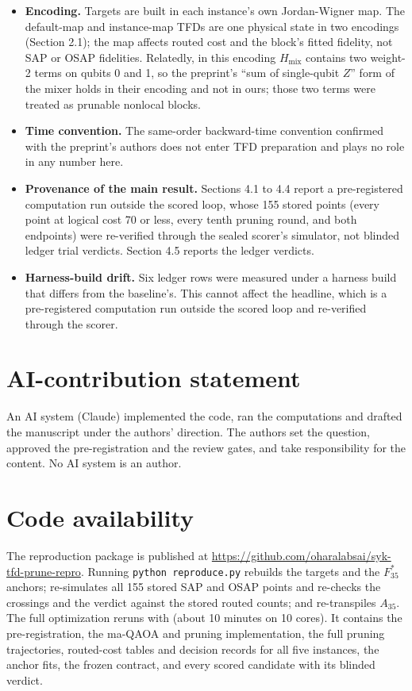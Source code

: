 \documentclass[11pt]{article}
\begin{document}
\begin{itemize}
\item \textbf{Encoding.} Targets are built in each instance's own Jordan-Wigner map. The default-map and instance-map TFDs are one physical state in two encodings (Section 2.1); the map affects routed cost and the block's fitted fidelity, not SAP or OSAP fidelities. Relatedly, in this encoding $H_{\mathrm{mix}}$ contains two weight-2 terms on qubits 0 and 1, so the preprint's ``sum of single-qubit $Z$'' form of the mixer holds in their encoding and not in ours; those two terms were treated as prunable nonlocal blocks.
\item \textbf{Time convention.} The same-order backward-time convention confirmed with the preprint's authors does not enter TFD preparation and plays no role in any number here.
\item \textbf{Provenance of the main result.} Sections 4.1 to 4.4 report a pre-registered computation run outside the scored loop, whose 155 stored points (every point at logical cost 70 or less, every tenth pruning round, and both endpoints) were re-verified through the sealed scorer's simulator, not blinded ledger trial verdicts. Section 4.5 reports the ledger verdicts.
\item \textbf{Harness-build drift.} Six ledger rows were measured under a harness build that differs from the baseline's. This cannot affect the headline, which is a pre-registered computation run outside the scored loop and re-verified through the scorer.
\end{itemize}

\section{AI-contribution statement}

An AI system (Claude) implemented the code, ran the computations and drafted the manuscript under the authors' direction. The authors set the question, approved the pre-registration and the review gates, and take responsibility for the content. No AI system is an author.

\section{Code availability}

The reproduction package is published at \url{https://github.com/oharalabsai/syk-tfd-prune-repro}. Running \texttt{python reproduce.py} rebuilds the targets and the $F_{35}^{*}$ anchors; re-simulates all 155 stored SAP and OSAP points and re-checks the crossings and the verdict against the stored routed counts; and re-transpiles $A_{35}$. The full optimization reruns with  (about 10 minutes on 10 cores). It contains the pre-registration, the ma-QAOA and pruning implementation, the full pruning trajectories, routed-cost tables and decision records for all five instances, the anchor fits, the frozen contract, and every scored candidate with its blinded verdict.



\end{document}
